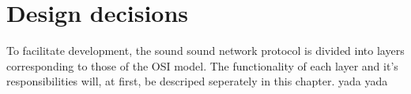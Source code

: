 \chapter{Design decisions}

To facilitate development, the sound sound network protocol is divided into layers corresponding to those of the OSI model. The functionality of each layer and it's responsibilities will, at first, be descriped seperately in this chapter. yada yada
